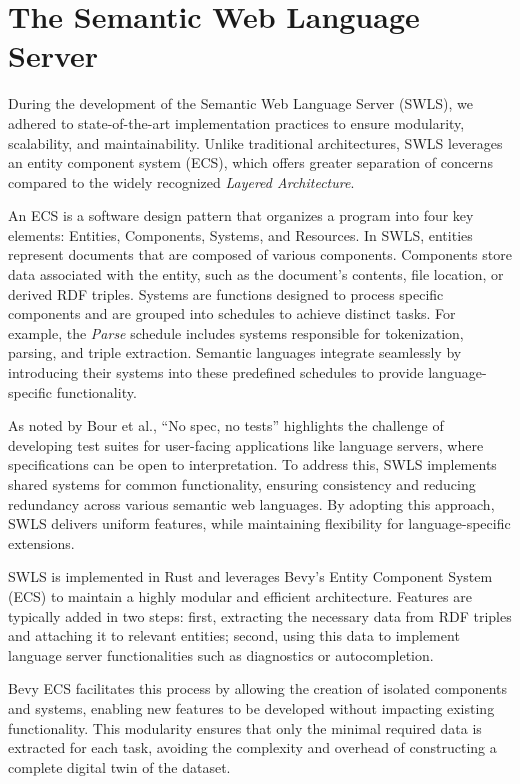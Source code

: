 \section{The Semantic Web Language Server}%
\label{sec:semantic_lsp}

During the development of the Semantic Web Language Server (SWLS), we adhered to state-of-the-art implementation practices to ensure modularity, scalability, and maintainability\cite{10.1145/3550355.3552452,10.1145/3563834.3567537,10.1145/3550355.3552452,Bour_2018}.
Unlike traditional architectures, SWLS leverages an entity component system (ECS), which offers greater separation of concerns compared to the widely recognized \textit{Layered Architecture}\cite{10.1145/3550355.3552452}.

An ECS is a software design pattern that organizes a program into four key elements: Entities, Components, Systems, and Resources. 
In SWLS, entities represent documents that are composed of various components. 
Components store data associated with the entity, such as the document's contents, file location, or derived RDF triples. 
Systems are functions designed to process specific components and are grouped into schedules to achieve distinct tasks. 
For example, the \textit{Parse} schedule includes systems responsible for tokenization, parsing, and triple extraction.
Semantic languages integrate seamlessly by introducing their systems into these predefined schedules to provide language-specific functionality.

As noted by Bour et al., “No spec, no tests” highlights the challenge of developing test suites for user-facing applications like language servers, where specifications can be open to interpretation\cite{Bour_2018}. 
To address this, SWLS implements shared systems for common functionality, ensuring consistency and reducing redundancy across various semantic web languages.
By adopting this approach, SWLS delivers uniform features, while maintaining flexibility for language-specific extensions.

SWLS is implemented in Rust and leverages Bevy’s Entity Component System (ECS) to maintain a highly modular and efficient architecture.
Features are typically added in two steps:
  first, extracting the necessary data from RDF triples and attaching it to relevant entities; 
  second, using this data to implement language server functionalities such as diagnostics or autocompletion.

Bevy ECS facilitates this process by allowing the creation of isolated components and systems, enabling new features to be developed without impacting existing functionality.
This modularity ensures that only the minimal required data is extracted for each task, avoiding the complexity and overhead of constructing a complete digital twin of the dataset.

